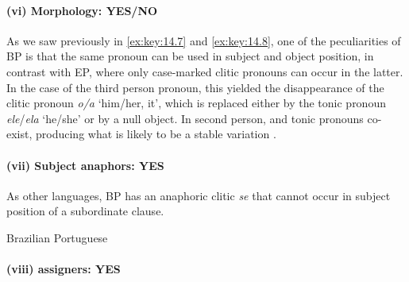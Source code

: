 \documentclass[output=paper]{langsci/langscibook}
\begin{document}
\paragraph*{(vi) Morphology: YES/NO}

As we saw previously in \eqref{ex:key:14.7} and \eqref{ex:key:14.8}, one of the
peculiarities of \gls{BP} is that the same pronoun can be used in subject and
object position, in contrast with \gls{EP}, where only case-marked clitic
pronouns can occur in the latter. In the case of the third person pronoun, this
yielded the disappearance of the clitic pronoun \emph{o/a} ‘him/her, it’, which
is replaced either by the tonic pronoun \emph{ele}/\emph{ela} ‘he/she’ or by a
null object. In second person,  and tonic pronouns co-exist, producing
what is likely to be a stable variation \citep{Galves2019}.

\paragraph*{(vii) Subject anaphors: YES}

As other  languages, \gls{BP} has an anaphoric clitic \emph{se} that
cannot occur in subject position of a subordinate clause.

\ea\label{ex:key:14.28}Brazilian Portuguese
\z

\paragraph*{(viii) assigners: YES}
\end{document}

